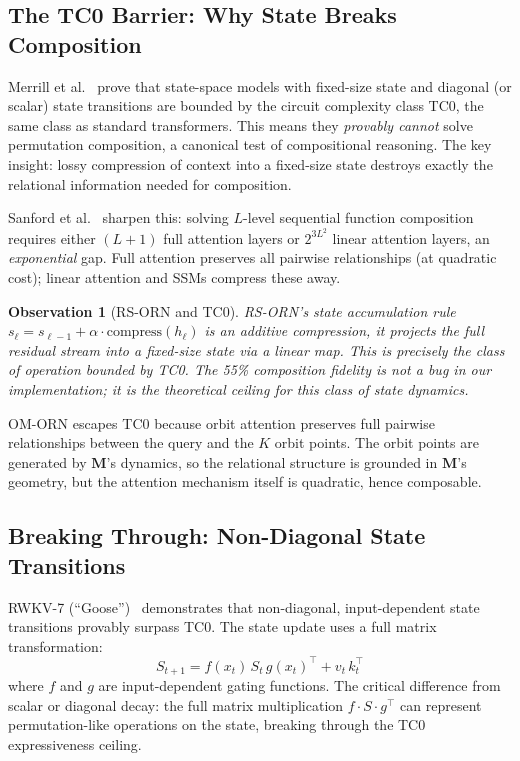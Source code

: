 \documentclass[11pt, a4paper]{article}
\newcommand{\M}{\mathbf{M}}
\theoremstyle{plain}
\newtheorem{observation}{Observation}
\theoremstyle{remark}
\begin{document}
\subsection{The TC0 Barrier: Why State Breaks Composition}

Merrill et al.~\cite{merrill2024illusion} prove that state-space models with fixed-size state and diagonal (or scalar) state transitions are bounded by the circuit complexity class TC0, the same class as standard transformers.
This means they \emph{provably cannot} solve permutation composition, a canonical test of compositional reasoning.
The key insight: lossy compression of context into a fixed-size state destroys exactly the relational information needed for composition.

Sanford et al.~\cite{sanford2025provable} sharpen this: solving $L$-level sequential function composition requires either $(L{+}1)$ full attention layers or $2^{3L^2}$ linear attention layers, an \emph{exponential} gap.
Full attention preserves all pairwise relationships (at quadratic cost); linear attention and SSMs compress these away.

\begin{observation}[RS-ORN and TC0]
RS-ORN's state accumulation rule $s_\ell = s_{\ell-1} + \alpha \cdot \text{compress}(h_\ell)$ is an additive compression, it projects the full residual stream into a fixed-size state via a linear map.
This is precisely the class of operation bounded by TC0.
The 55\% composition fidelity is not a bug in our implementation; it is the theoretical ceiling for this class of state dynamics.
\end{observation}

OM-ORN escapes TC0 because orbit attention preserves full pairwise relationships between the query and the $K$ orbit points.
The orbit points are generated by $\M$'s dynamics, so the relational structure is grounded in $\M$'s geometry, but the attention mechanism itself is quadratic, hence composable.

\subsection{Breaking Through: Non-Diagonal State Transitions}

RWKV-7 (``Goose'')~\cite{peng2025rwkv7} demonstrates that non-diagonal, input-dependent state transitions provably surpass TC0.
The state update uses a full matrix transformation:
\begin{equation}
    S_{t+1} = f(x_t) \, S_t \, g(x_t)^\top + v_t \, k_t^\top
\end{equation}
where $f$ and $g$ are input-dependent gating functions.
The critical difference from scalar or diagonal decay: the full matrix multiplication $f \cdot S \cdot g^\top$ can represent permutation-like operations on the state, breaking through the TC0 expressiveness ceiling.
\end{document}
